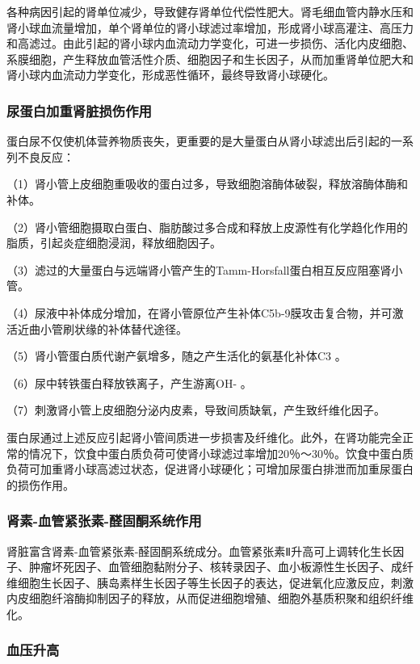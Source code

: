 各种病因引起的肾单位减少，导致健存肾单位代偿性肥大。肾毛细血管内静水压和肾小球血流量增加，单个肾单位的肾小球滤过率增加，形成肾小球高灌注、高压力和高滤过。由此引起的肾小球内血流动力学变化，可进一步损伤、活化内皮细胞、系膜细胞，产生释放血管活性介质、细胞因子和生长因子，从而加重肾单位肥大和肾小球内血流动力学变化，形成恶性循环，最终导致肾小球硬化。

\subsubsection{尿蛋白加重肾脏损伤作用}

蛋白尿不仅使机体营养物质丧失，更重要的是大量蛋白从肾小球滤出后引起的一系列不良反应：

（1）肾小管上皮细胞重吸收的蛋白过多，导致细胞溶酶体破裂，释放溶酶体酶和补体。

（2）肾小管细胞摄取白蛋白、脂肪酸过多合成和释放上皮源性有化学趋化作用的脂质，引起炎症细胞浸润，释放细胞因子。

（3）滤过的大量蛋白与远端肾小管产生的Tamm-Horsfall蛋白相互反应阻塞肾小管。

（4）尿液中补体成分增加，在肾小管原位产生补体C5b-9膜攻击复合物，并可激活近曲小管刷状缘的补体替代途径。

（5）肾小管蛋白质代谢产氨增多，随之产生活化的氨基化补体C{3} 。

（6）尿中转铁蛋白释放铁离子，产生游离OH{-} 。

（7）刺激肾小管上皮细胞分泌内皮素，导致间质缺氧，产生致纤维化因子。

蛋白尿通过上述反应引起肾小管间质进一步损害及纤维化。此外，在肾功能完全正常的情况下，饮食中蛋白质负荷可使肾小球滤过率增加20％～30％。饮食中蛋白质负荷可加重肾小球高滤过状态，促进肾小球硬化；可增加尿蛋白排泄而加重尿蛋白的损伤作用。

\subsubsection{肾素-血管紧张素-醛固酮系统作用}

肾脏富含肾素-血管紧张素-醛固酮系统成分。血管紧张素Ⅱ升高可上调转化生长因子、肿瘤坏死因子、血管细胞黏附分子、核转录因子、血小板源性生长因子、成纤维细胞生长因子、胰岛素样生长因子等生长因子的表达，促进氧化应激反应，刺激内皮细胞纤溶酶抑制因子的释放，从而促进细胞增殖、细胞外基质积聚和组织纤维化。

\subsubsection{血压升高}

